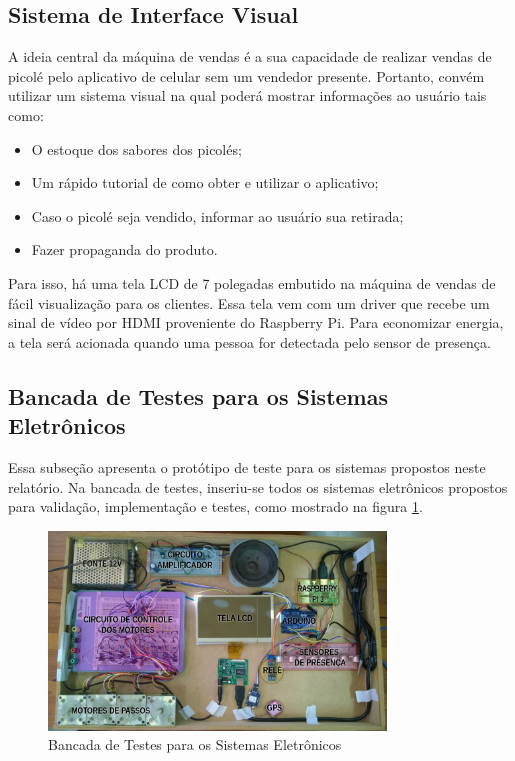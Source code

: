 \subsection{Sistema de Interface Visual}

A ideia central da máquina de vendas é a sua capacidade de realizar vendas de picolé pelo aplicativo de celular sem um vendedor presente. Portanto, convém utilizar um sistema visual na qual poderá mostrar informações ao usuário tais como:

\begin{itemize}
  \item O estoque dos sabores dos picolés;
  \item Um rápido tutorial de como obter e utilizar o aplicativo;
  \item Caso o picolé seja vendido, informar ao usuário sua retirada;
  \item Fazer propaganda do produto.
\end{itemize}

Para isso, há uma tela LCD de 7 polegadas embutido na máquina de vendas de fácil visualização para os clientes. Essa tela vem com um driver que recebe um sinal de vídeo por HDMI proveniente do Raspberry Pi. Para economizar energia, a tela será acionada quando uma pessoa for detectada pelo sensor de presença.

\subsection{Bancada de Testes para os Sistemas Eletrônicos}

Essa subseção apresenta o protótipo de teste para os sistemas propostos neste relatório. Na bancada de testes, inseriu-se todos os sistemas eletrônicos propostos para validação, implementação e testes, como mostrado na figura  \ref{fig:bancada_teste_eletronica}.

\begin{figure}[H]
\centering
\includegraphics[width=0.8\textwidth]{figuras/bancada_teste_eletronica}
 \caption{Bancada de Testes para os Sistemas Eletrônicos}
\label{fig:bancada_teste_eletronica}
\end{figure}

